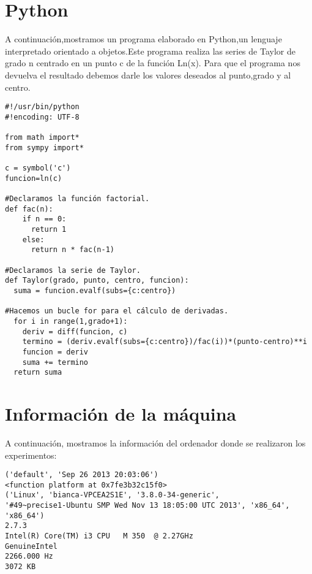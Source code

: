 \documentclass[spanish,a4paper,11pt,twoside]{report}
\begin{document}
\section{Python}
A continuación,mostramos un programa elaborado en Python,un lenguaje interpretado orientado a objetos.Este programa realiza las series de Taylor de grado n centrado en un punto c de la función Ln(x).
Para que el programa nos devuelva el resultado debemos darle los valores deseados al punto,grado y al centro. 
\begin{verbatim}
#!/usr/bin/python
#!encoding: UTF-8

from math import*
from sympy import*     

c = symbol('c')   
funcion=ln(c)

#Declaramos la función factorial.
def fac(n):    
    if n == 0:
      return 1
    else:
      return n * fac(n-1)

#Declaramos la serie de Taylor.
def Taylor(grado, punto, centro, funcion):   
  suma = funcion.evalf(subs={c:centro}) 
  
#Hacemos un bucle for para el cálculo de derivadas. 
  for i in range(1,grado+1):                
    deriv = diff(funcion, c)
    termino = (deriv.evalf(subs={c:centro})/fac(i))*(punto-centro)**i
    funcion = deriv
    suma += termino
  return suma  
\end{verbatim}


\section{Información de la máquina}
A continuación, mostramos la información del ordenador donde se realizaron los experimentos:

\begin{verbatim}
('default', 'Sep 26 2013 20:03:06')
<function platform at 0x7fe3b32c15f0>
('Linux', 'bianca-VPCEA2S1E', '3.8.0-34-generic',
'#49~precise1-Ubuntu SMP Wed Nov 13 18:05:00 UTC 2013', 'x86_64', 'x86_64')
2.7.3
Intel(R) Core(TM) i3 CPU   M 350  @ 2.27GHz
GenuineIntel
2266.000 Hz 
3072 KB
\end{verbatim}




\end{document}
